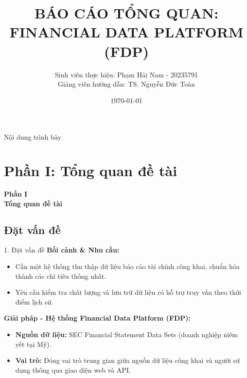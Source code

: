\documentclass[t, aspectratio=169]{beamer} %
\title{BÁO CÁO TỔNG QUAN: FINANCIAL DATA PLATFORM (FDP)}
\author[Phạm Hải Nam]{Sinh viên thực hiện: Phạm Hải Nam - 20235791 \\ Giảng viên hướng dẫn: TS. Nguyễn Đức Toàn}
\date{\today}
\begin{document}
	
	\hustintropage{} 
	\hustsectionpage{} 
	
	\husttitlepage
	
	\begin{frame}[allowframebreaks]{Nội dung trình bày}
		\tableofcontents[hideallsubsections]
	\end{frame}
	
	\resetPageCount  
	\showPageNumber  
	
	\useStyleHustFull
	\useThinBar 
	
	\section{Phần I: Tổng quan đề tài}
	\begin{frame}
		\vfill
		\centering
		{\Huge \textbf{Phần I}} \\[1em]
		{\huge \textbf{Tổng quan đề tài}}
		\vfill
	\end{frame}
	
	\subsection{Đặt vấn đề}
	\begin{frame}{1. Đặt vấn đề}
		\textbf{Bối cảnh \& Nhu cầu:}
		\begin{itemize}
			\item Cần một hệ thống thu thập dữ liệu báo cáo tài chính công khai, chuẩn hóa thành các chỉ tiêu thống nhất.
			\item Yêu cầu kiểm tra chất lượng và lưu trữ dữ liệu có hỗ trợ truy vấn theo thời điểm lịch sử.
		\end{itemize}
		
		\vspace{1em}
		
		\textbf{Giải pháp - Hệ thống Financial Data Platform (FDP):}
		\begin{itemize}
			\item \textbf{Nguồn dữ liệu:} SEC Financial Statement Data Sets (doanh nghiệp niêm yết tại Mỹ).
			\item \textbf{Vai trò:} Đóng vai trò trung gian giữa nguồn dữ liệu công khai và người sử dụng thông qua giao diện web và API.
		\end{itemize}
	\end{frame}
	
\end{document}
